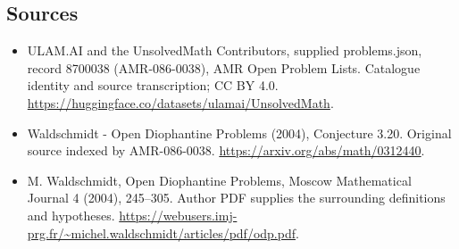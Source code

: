\documentclass[11pt,a4paper]{article}
\begin{document}
\subsection{Sources}
\begin{itemize}
\item[S1] ULAM.AI and the UnsolvedMath Contributors, supplied problems.json, record 8700038 (AMR-086-0038), AMR Open Problem Lists. Catalogue identity and source transcription; CC BY 4.0.
\url{https://huggingface.co/datasets/ulamai/UnsolvedMath}.
\item[S2] Waldschmidt - Open Diophantine Problems (2004), Conjecture 3.20. Original source indexed by AMR-086-0038.
\url{https://arxiv.org/abs/math/0312440}.
\item[S3] M. Waldschmidt, Open Diophantine Problems, Moscow Mathematical Journal 4 (2004), 245–305. Author PDF supplies the surrounding definitions and hypotheses.
\url{https://webusers.imj-prg.fr/~michel.waldschmidt/articles/pdf/odp.pdf}.
\end{itemize}
\end{document}
